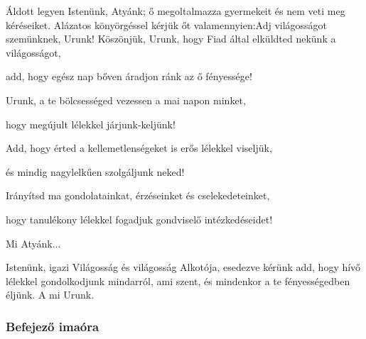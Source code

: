 \documentclass[twoside]{article}
\begin{document}





\begin{preces}{Áldott legyen Istenünk, Atyánk; ő megoltalmazza gyermekeit és nem veti meg kéréseiket. Alázatos könyörgéssel kérjük őt valamennyien:}{Adj világosságot szemünknek, Urunk!}
  Köszönjük, Urunk, hogy Fiad által elküldted nekünk a világosságot,

  \reddash add, hogy egész nap bőven áradjon ránk az ő fényessége!

  Urunk, a te bölcsességed vezessen a mai napon minket,

  \reddash hogy megújult lélekkel járjunk-keljünk!

  Add, hogy érted a kellemetlenségeket is erős lélekkel viseljük,

  \reddash és mindig nagylelkűen szolgáljunk neked!

  Irányítsd ma gondolatainkat, érzéseinket és cselekedeteinket,

  \reddash hogy tanulékony lélekkel fogadjuk gondviselő intézkedéseidet!
\end{preces}
Mi Atyánk...


Istenünk, igazi Világosság és világosság Alkotója, esedezve kérünk add, hogy hívő lélekkel gondolkodjunk mindarról, ami szent, és mindenkor a te fényességedben éljünk. A mi Urunk.

\label{f5/Compl}

\subsubsection*{Befejező imaóra}



\end{document}
